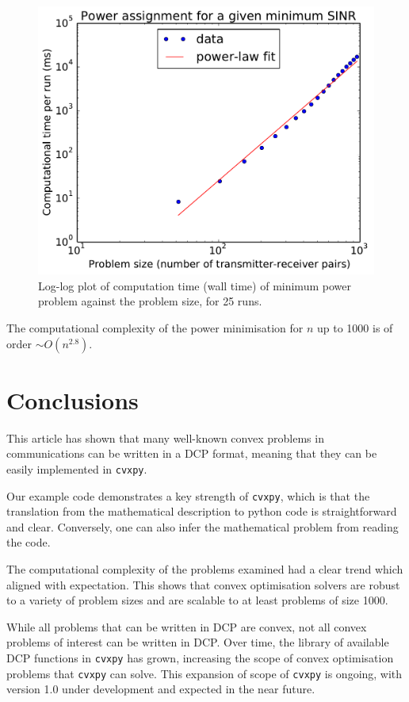 \documentclass[twocolumn,secnumarabic,amssymb, nobibnotes, aps, prl,superscriptaddress]{revtex4-1}
\begin{document}
\begin{figure}[H]
\includegraphics[width=0.9\linewidth]{magazineMinSINR.pdf}
\caption{\label{fig:MinSINR}Log-log plot of computation time (wall time) of minimum power problem against the problem size, for 25 runs.}
\end{figure}

The computational complexity of the power minimisation for $n$ up to 1000 is of order $\sim O(n^{2.8})$.

\section{Conclusions}
This article has shown that many well-known convex problems in communications can be written in a DCP format, meaning that they can be easily implemented in \texttt{cvxpy}.

Our example code demonstrates a key strength of \texttt{cvxpy}, which is that the translation from the mathematical description to python code is straightforward and clear.  Conversely, one can also infer the mathematical problem from reading the code.

The computational complexity of the problems examined had a clear trend which aligned with expectation.  This shows that convex optimisation solvers are robust to a variety of problem sizes and are scalable to at least problems of size 1000.

While all problems that can be written in DCP are convex, not all convex problems of interest can be written in DCP.  Over time, the library of available DCP functions in \texttt{cvxpy} has grown, increasing the scope of convex optimisation problems that \texttt{cvxpy} can solve.  This expansion of scope of \texttt{cvxpy} is ongoing, with version 1.0 under development and expected in the near future.
\end{document}
